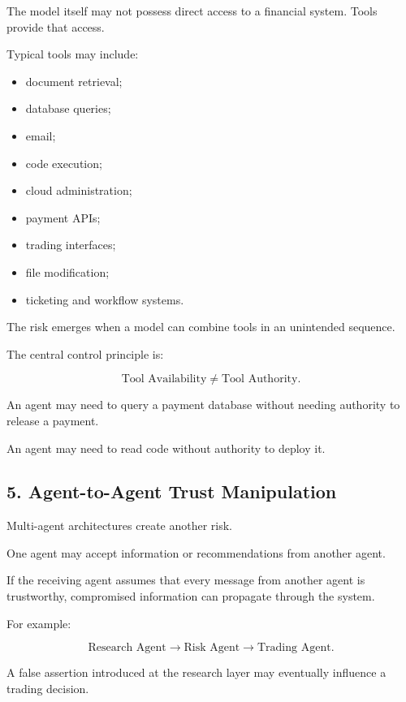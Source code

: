 The model itself may not possess direct access to a financial system. Tools provide that access.

Typical tools may include:

\begin{itemize}
    \item document retrieval;
    \item database queries;
    \item email;
    \item code execution;
    \item cloud administration;
    \item payment APIs;
    \item trading interfaces;
    \item file modification;
    \item ticketing and workflow systems.
\end{itemize}

The risk emerges when a model can combine tools in an unintended sequence.

The central control principle is:

\begin{equation}
\text{Tool Availability}
\neq
\text{Tool Authority}.
\end{equation}

An agent may need to query a payment database without needing authority to release a payment.

An agent may need to read code without authority to deploy it.

\subsection{5. Agent-to-Agent Trust Manipulation}

Multi-agent architectures create another risk.

One agent may accept information or recommendations from another agent.

If the receiving agent assumes that every message from another agent is trustworthy, compromised information can propagate through the system.

For example:

\begin{equation}
\text{Research Agent}
\rightarrow
\text{Risk Agent}
\rightarrow
\text{Trading Agent}.
\end{equation}

A false assertion introduced at the research layer may eventually influence a trading decision.

